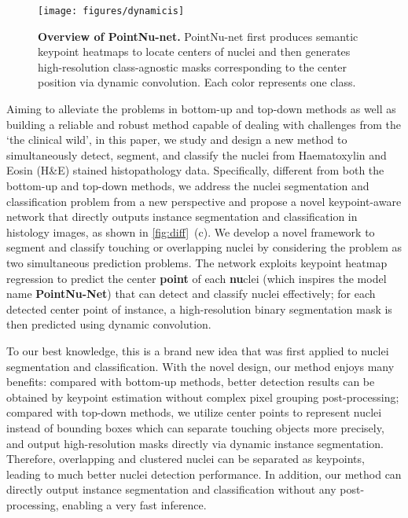 \documentclass[lettersize,journal]{IEEEtran}
\begin{document}
\begin{figure*}[!t]
\centering
\texttt{[image: figures/dynamicis]}
\caption{\textbf{Overview of PointNu-net.} PointNu-net first produces semantic keypoint heatmaps to locate centers of nuclei and then generates high-resolution class-agnostic masks corresponding to the center position via dynamic convolution. Each color represents one class.}
\label{fig:dy}
\end{figure*}

Aiming to alleviate the problems in bottom-up and top-down methods as well as  building a reliable and robust method capable of dealing with challenges from the ‘the clinical wild’, in this paper, we study and design a new method to simultaneously detect, segment, and classify the nuclei from Haematoxylin and Eosin (H\&E) stained histopathology data. Specifically, different from both the bottom-up and top-down methods, we address the nuclei segmentation and classification problem from a new perspective and propose a novel keypoint-aware network that directly outputs instance segmentation and classification in histology images, as shown in \autoref{fig:diff}~(c). We develop a novel framework to segment and classify touching or overlapping nuclei by considering the problem as two simultaneous prediction problems. The network exploits keypoint heatmap regression to predict the center \textbf{point} of each \textbf{nu}clei (which inspires the model name \textbf{PointNu-Net}) that can detect and classify nuclei effectively; for each detected center point of instance, a high-resolution binary segmentation mask is then predicted using dynamic convolution.  

To our best knowledge, this is a brand new idea that was first applied to nuclei segmentation and classification. With the novel design, our method enjoys many benefits: compared with bottom-up methods,  better detection results  can be obtained by keypoint estimation without complex pixel grouping post-processing; compared with top-down methods, we utilize center points to represent nuclei instead of bounding boxes which can separate touching objects more precisely, and output high-resolution masks directly via dynamic instance segmentation. Therefore, overlapping and clustered nuclei can be separated as keypoints, leading to much better nuclei detection performance. In addition, our method can directly output instance segmentation and classification without any post-processing, enabling a very fast inference. 
\end{document}
